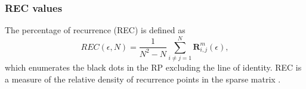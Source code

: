\documentclass[fleqn,10pt]{wlscirep}
\begin{document}
\subsubsection*{REC values}
The percentage of recurrence (REC) is defined as
\begin{equation}
REC(\epsilon,N) = 
		\frac{1}{N^2 - N} \sum^{N}_{i \neq j = 1} 
		\mathbf{R}^{m}_{i,j}(\epsilon),
\end{equation}
which enumerates the black dots in the RP excluding the line of identity.
REC is a measure of the relative density of recurrence points in the sparse matrix \cite{marwan2015}.
\end{document}
